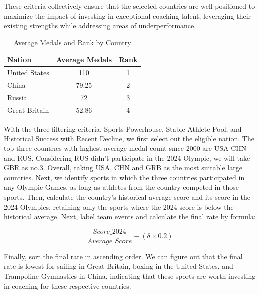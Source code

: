 \documentclass[12pt]{article}
\begin{document}
These criteria collectively ensure that the selected countries are well-positioned to maximize the impact of investing in exceptional coaching talent, leveraging their existing strengths while addressing areas of underperformance.\\

\begin{table}[h!]
\caption{Average Medals and Rank by Country}
\centering
\begin{tabular}{lcc}
\toprule
\textbf{Nation} & \textbf{Average Medals} & \textbf{Rank} \\
\midrule
United States & 110     & 1 \\
China         & 79.25   & 2 \\
Russia        & 72      & 3 \\
Great Britain & 52.86   & 4 \\
\bottomrule
\end{tabular}
\label{tab:average_medals}
\end{table}

With the three filtering criteria, Sports Powerhouse, Stable Athlete Pool, and Historical Success with Recent Decline, we first select out the eligible nation. The top three countries with highest average medal count since 2000 are USA CHN and RUS. Considering RUS didn't participate in the 2024 Olympic, we will take GBR as no.3. Overall, taking USA, CHN and GRB as the most suitable large countries. Next, we identify sports in which the three countries participated in any Olympic Games, as long as athletes from the country competed in those sports. Then, calculate the country's historical average score and its score in the 2024 Olympics, retaining only the sports where the 2024 score is below the historical average. Next, label team events and calculate the final rate by formula:

\begin{equation}
\frac{Score\_2024}{Average\_Score} - (\delta \times 0.2)
\end{equation}

Finally, sort the final rate in ascending order. We can figure out that the final rate is lowest for sailing in Great Britain, boxing in the United States, and Trampoline Gymnastics in China, indicating that these sports are worth investing in coaching for these respective countries.
\end{document}
